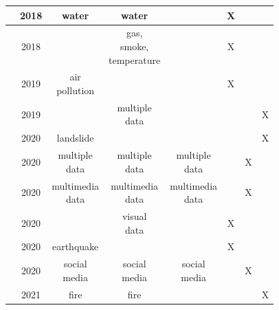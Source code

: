 \begin{refsection}
\begin{table}
{\begin{tabular}{c|c|c|c|c|c|c|c}
    \hline
    \citeauthor{iotFlood1} & 2018 & water & water & & X & & \\
    
    \hline
    \citeauthor{iotFire1} & 2018 &  & \makecell{gas,\\smoke,\\temperature} & & X & & \\
    
    \hline
    \citeauthor{iotPollution1} & 2019 & \makecell{air\\pollution} & & & X & & \\
    
    \hline
    \citeauthor{Alkhatib2019771} & 2019 & & \makecell{multiple\\data} & & & & X \\
    
    \hline
    \citeauthor{BRAGAGNOLO2020104240} & 2020 & landslide & & & & & X \\
    
    \hline
    \citeauthor{emergenciesmetric2} & 2020 & \makecell{multiple\\data} & \makecell{multiple\\data} &  \makecell{multiple\\data} &  & X & \\
    
    \hline
    \citeauthor{emergenciesmetric3} & 2020 & \makecell{multimedia\\data} & \makecell{multimedia\\data} & \makecell{multimedia\\data} &  & X &\\
    
    \hline
    \citeauthor{iotCovid1} & 2020 &  & \makecell{visual\\data} &  & X & & \\
    
    \hline
    \citeauthor{iotEarthquake1} & 2020 & earthquake &  &  & X & & \\
    
    \hline
    \citeauthor{twitterDetection1} & 2020 & \makecell{social\\media} & \makecell{social\\media} &  \makecell{social\\media} &  & X & \\
    
    \hline
    \citeauthor{fireBigdata1} & 2021 & fire & fire & & & & X \\
  \end{tabular}
  }
\end{table}


\end{refsection}
